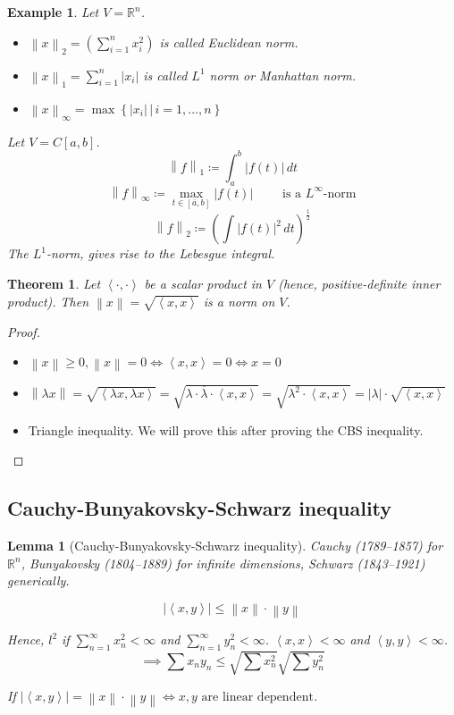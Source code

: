 \documentclass[a4paper]{article}
\newcounter{lecref}[section]
\numberwithin{lecref}{section}
\newtheorem{theorem}[lecref]{Theorem}
\newtheorem{example}[lecref]{Example}
\newtheorem{lemma}[lecref]{Lemma}
\newcommand{\setdef}[2]{\left\{\left.#1\,\right|\,#2\right\}}
\newcommand{\angel}[1]{\left\langle#1\right\rangle}
\newcommand{\norm}[1]{\left\|#1\right\|}
\newcommand{\card}[1]{\left|#1\right|}
\begin{document}
\begin{example}
  Let $V = \mathbb R^n$.
  \begin{itemize}
    \item $\norm{x}_2 = \left(\sum_{i=1}^n x_i^2\right)$ is called \emph{Euclidean norm}.
    \item $\norm{x}_1 = \sum_{i=1}^n \card{x_i}$ is called \emph{$L^1$ norm} or \emph{Manhattan norm}.
    \item $\norm{x}_{\infty} = \max\setdef{\card{x_i}}{i = 1, \dots, n}$
  \end{itemize}
  Let $V = C[a,b]$.
  \[ \norm{f}_1 \coloneqq \int_a^b \card{f(t)} \, dt \]
  \[ \norm{f}_\infty \coloneqq \max_{t \in [\overline{a}, b]} \card{f(t)} \qquad \text{ is a $L^\infty$-norm} \]
  \[ \norm{f}_2 \coloneqq \left(\int \card{f(t)}^2 \, dt \right)^{\frac12} \]
  The $L^1$-norm, gives rise to the Lebesgue integral.
\end{example}

\begin{theorem} %
  \label{thm:t819}
  Let $\angel{\cdot,\cdot}$ be a scalar product in $V$ (hence, positive-definite inner product).
  Then $\norm{x} = \sqrt{\angel{x,x}}$ is a norm on $V$.
\end{theorem}

\begin{proof}
  \begin{itemize}
    \item $\norm{x} \geq 0, \norm{x} = 0 \iff \angel{x,x} = 0 \iff x = 0$
    \item $\norm{\lambda x} = \sqrt{\angel{\lambda x, \lambda x}} = \sqrt{\lambda \cdot \overline{\lambda} \cdot \angel{x,x}} = \sqrt{\lambda^2 \cdot \angel{x,x}} = \card{\lambda} \cdot \sqrt{\angel{x,x}}$
    \item Triangle inequality. We will prove this after proving the CBS inequality.
  \end{itemize}
\end{proof}

\subsection{Cauchy-Bunyakovsky-Schwarz inequality}

\begin{lemma}[Cauchy-Bunyakovsky-Schwarz inequality] %
  \label{thm:cbs}
  Cauchy (1789--1857) for $\mathbb R^n$,
  Bunyakovsky (1804--1889) for infinite dimensions,
  Schwarz (1843--1921) generically.

  \[ \card{\angel{x,y}} \leq \norm{x} \cdot \norm{y} \]

  Hence, $l^2$ if $\sum_{n=1}^\infty x_n^2 < \infty$ and $\sum_{n=1}^\infty y_n^2 < \infty$.
  $\angel{x,x} < \infty$ and $\angel{y,y} < \infty$.
  \[ \implies \sum x_n y_n \leq \sqrt{\sum x_n^2} \sqrt{\sum y_n^2} \]

  If $\card{\angel{x,y}} = \norm{x} \cdot \norm{y} \iff x,y \text{ are linear dependent}$.
\end{lemma}
\end{document}
